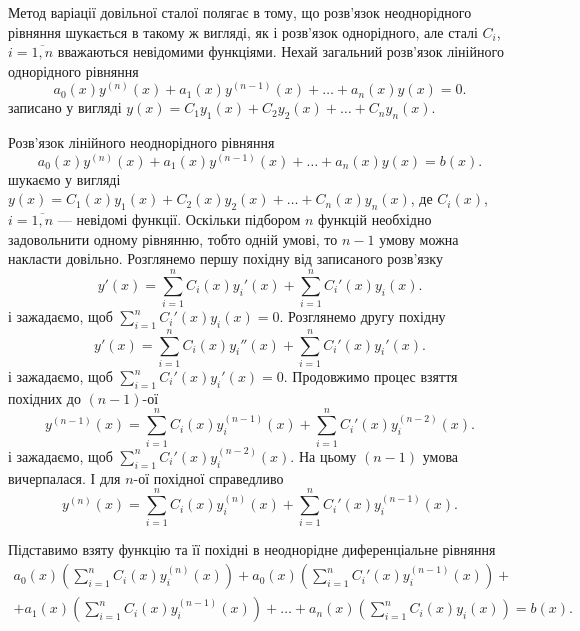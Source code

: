 Метод варіації довільної сталої полягає в тому, що розв'язок неоднорідного рівняння шукається в такому ж вигляді, як і розв'язок однорідного, але сталі $C_i$, $i = \overline{1, n}$ вважаються невідомими функціями. Нехай загальний розв'язок лінійного однорідного рівняння
\begin{equation*}
	a_0(x) y^{(n)}(x) + a_1(x) y^{(n - 1)}(x) + \ldots + a_n(x) y(x) = 0.
\end{equation*}
записано у вигляді $y(x) = C_1 y_1(x) + C_2 y_2(x) + \ldots + C_n y_n(x)$. \parvskip

Розв'язок лінійного неоднорідного рівняння
\begin{equation*}
	a_0(x) y^{(n)}(x) + a_1(x) y^{(n - 1)}(x) + \ldots + a_n(x) y(x) = b(x).
\end{equation*}
шукаємо у вигляді $y(x) = C_1(x) y_1(x) + C_2(x) y_2(x) + \ldots + C_n(x) y_n(x)$, де $C_i(x)$, $i = \overline{1, n}$ --- невідомі функції. Оскільки підбором $n$ функцій необхідно задовольнити одному рівнянню, тобто одній умові, то $n - 1$ умову можна накласти довільно. Розглянемо першу похідну від записаного розв'язку
\begin{equation*}
	y'(x) = \sum_{i = 1}^n C_i(x) y_i'(x) + \sum_{i = 1}^n C_i'(x) y_i(x).
\end{equation*}
і зажадаємо, щоб $\sum_{i = 1}^n C_i'(x) y_i(x) = 0$. Розглянемо другу похідну
\begin{equation*}
	y'(x) = \sum_{i = 1}^n C_i(x) y_i''(x) + \sum_{i = 1}^n C_i'(x) y_i'(x).
\end{equation*}
і зажадаємо, щоб $\sum_{i = 1}^n C_i'(x) y_i'(x) = 0$. Продовжимо процес взяття похідних до $(n - 1)$-ої 
\begin{equation*}
	y^{(n - 1)}(x) = \sum_{i = 1}^n C_i(x) y_i^{(n - 1)}(x) + \sum_{i = 1}^n C_i'(x) y_i^{(n - 2)}(x).
\end{equation*}
і зажадаємо, щоб $\sum_{i = 1}^n C_i'(x) y_i^{(n - 2)}(x)$. На цьому $(n - 1)$ умова вичерпалася. І для $n$-ої похідної справедливо
\begin{equation*}
	y^{(n)}(x) = \sum_{i = 1}^n C_i(x) y_i^{(n)}(x) + \sum_{i = 1}^n C_i'(x) y_i^{(n - 1)}(x).
\end{equation*}

Підставимо взяту функцію та її похідні в неоднорідне диференціальне рівняння
\begin{multline*}
 	a_0(x) \left( \sum_{i = 1}^n C_i(x) y_i^{(n)}(x) \right) + a_0(x) \left( \sum_{i = 1}^n C_i'(x) y_i^{(n - 1)}(x) \right) + \\ + a_1(x) \left( \sum_{i = 1}^n C_i(x) y_i^{(n - 1)}(x) \right) + \ldots + a_n(x) \left( \sum_{i = 1}^n C_i(x) y_i(x) \right) = b(x).
\end{multline*} 

